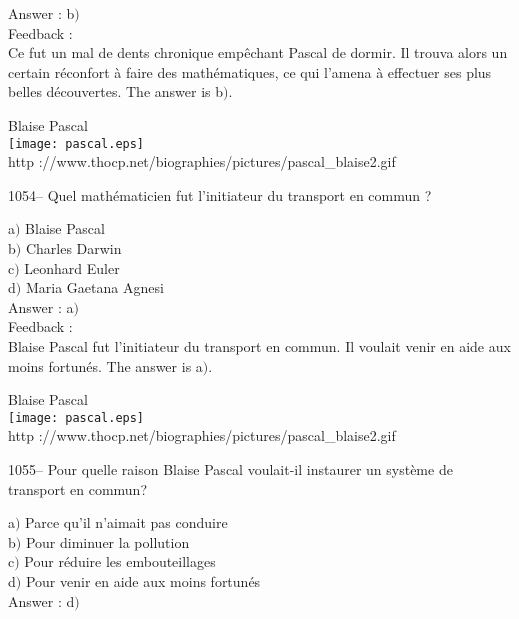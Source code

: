 \documentclass[letterpaper, 12pt]{article}
\begin{document}
Answer : b$)$\\

Feedback : \\
Ce fut un mal de dents chronique emp\^echant Pascal de dormir. Il
trouva alors un certain r\'econfort \`a faire des math\'ematiques,
ce qui l'amena \`a effectuer ses plus belles d\'ecouvertes.
The answer is b$)$.\\

        \begin{center}
        Blaise Pascal\\
    \texttt{[image: pascal.eps]}\\
        {\footnotesize http
://www.thocp.net/biographies/pictures/pascal\_blaise2.gif}
    \end{center}

1054-- Quel math\'ematicien fut l'initiateur du transport en commun
?

a$)$ Blaise Pascal \\
b$)$ Charles Darwin  \\
c$)$ Leonhard Euler  \\
d$)$ Maria Gaetana Agnesi\\

Answer : a$)$\\

Feedback : \\
Blaise Pascal fut l'initiateur du transport en commun. Il voulait
venir en aide aux moins fortun\'es.
The answer is a$)$.\\

        \begin{center}
        Blaise Pascal\\
    \texttt{[image: pascal.eps]}\\
        {\footnotesize http
://www.thocp.net/biographies/pictures/pascal\_blaise2.gif}
    \end{center}

1055-- Pour quelle raison Blaise Pascal voulait-il instaurer un
syst\`eme de transport en commun?

a$)$ Parce qu'il n'aimait pas conduire \\
b$)$ Pour diminuer la pollution \\
c$)$ Pour r\'eduire les embouteillages  \\
d$)$ Pour venir en aide aux moins fortun\'es \\

Answer : d$)$\\
\end{document}

